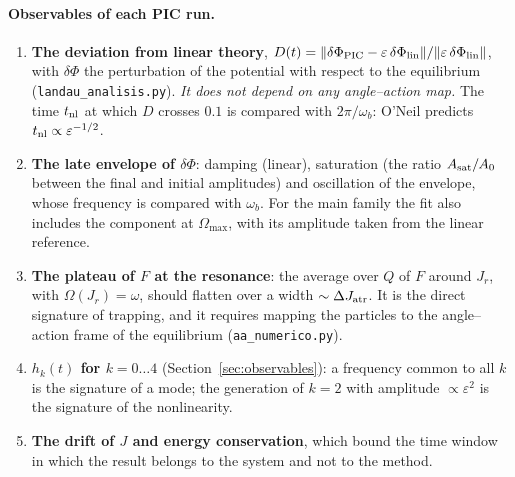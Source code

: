 \documentclass[11pt,a4paper]{article}
\begin{document}
\paragraph{Observables of each PIC run.}
\begin{enumerate}
\item \textbf{The deviation from linear theory},
$D(t)=\|\delta\Phi_{\rm PIC}-\varepsilon\,\delta\Phi_{\rm lin}\|/\|\varepsilon\,\delta\Phi_{\rm lin}\|$, with $\delta\Phi$ the
perturbation of the potential with respect to the equilibrium
(\texttt{landau\_\allowbreak analisis.py}). \emph{It does not depend on any angle--action map.}
The time $t_{\rm nl}$ at which $D$ crosses $0.1$ is compared with $2\pi/\omega_b$: O'Neil predicts
$t_{\rm nl}\propto\varepsilon^{-1/2}$.
\item \textbf{The late envelope of $\delta\Phi$}: damping (linear), saturation (the ratio
$A_{\rm sat}/A_0$ between the final and initial amplitudes) and oscillation of the envelope,
whose frequency is compared with $\omega_b$. For the main family the fit also includes the
component at $\Omega_{\max}$, with its amplitude taken from the linear reference.
\item \textbf{The plateau of $F$ at the resonance}: the average over $Q$ of $F$ around $J_r$, with
$\Omega(J_r)=\omega$, should flatten over a width $\sim\Delta J_{\rm atr}$. It is the direct signature of
trapping, and it requires mapping the particles to the angle--action frame of the
equilibrium (\texttt{aa\_\allowbreak numerico.py}).
\item \textbf{$h_k(t)$ for $k=0\ldots4$} (Section~\ref{sec:observables}): a frequency common to
all $k$ is the signature of a mode; the generation of $k=2$ with amplitude $\propto\varepsilon^2$ is
the signature of the nonlinearity.
\item \textbf{The drift of $J$ and energy conservation}, which bound the time window in which
the result belongs to the system and not to the method.
\end{enumerate}
\end{document}
